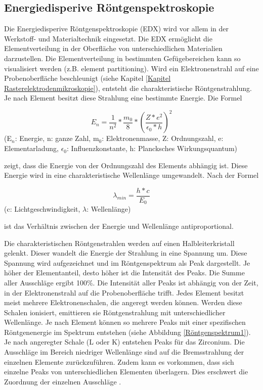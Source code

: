 \documentclass[a4paper, 11pt]{tubsreprt}
\begin{document}
\subsection{Energiedisperive Röntgenspektroskopie}\label{Kapitel EDX}

Die Energiedisperive Röntgenspektroskopie (EDX) wird vor allem in der Werkstoff- und Materialtechnik eingesetzt. Die EDX ermöglicht die Elementverteilung in der Oberfläche von unterschiedlichen Materialien  darzustellen. Die Elementverteilung in bestimmten Gefügebereichen kann so visualisiert werden (z.B. element partitioning).
Wird ein Elektronenstrahl auf eine Probenoberfläche beschleunigt (siehe Kapitel \ref{Kapitel Rasterelektrodenmikroskopie}), entsteht die charakteristische Röntgenstrahlung. Je nach Element besitzt diese Strahlung eine bestimmte Energie. Die Formel

\begin{equation}
E_{ n }=\frac{ 1 }{ n^{ 2 } }*\frac{ m_{ 0 } }{ 8 }*\left( \frac{ Z*e^{ 2 } }{ \epsilon_{ 0 }*h } \right)^{ 2 }
\end{equation}
(E$_{n}$: Energie, n: ganze Zahl, m$_{0}$: Elektronenmasse, Z: Ordnungszahl, e: Elementarladung, $\epsilon_{0}$: Influenzkonstante, h: Plancksches Wirkungsquantum)\cite{Gemming2013}

zeigt, dass die Energie von der Ordnungszahl des Elements abhängig ist. Diese Energie wird in eine charakteristische Wellenlänge umgewandelt. Nach der Formel  

\begin{equation}
\lambda_{ min }=\frac{ h*c }{ E_{ 0 } }
\end{equation}
(c: Lichtgeschwindigkeit, $\lambda$: Wellenlänge)\cite{Gemming2013}

ist das Verhältnis zwischen der Energie und Wellenlänge antiproportional.


Die charakteristischen Röntgenstrahlen werden auf einen Halbleiterkristall gelenkt. Dieser wandelt die Energie der Strahlung in eine Spannung um. Diese Spannung wird aufgezeichnet und im Röntgenspektrum als Peak dargestellt. Je höher der Elementanteil, desto höher ist die Intensität des Peaks. Die Summe aller Ausschläge ergibt 100\%. Die Intensität aller Peaks ist abhängig von der Zeit, in der Elektronenstrahl auf die Probenoberfläche trifft. 
Jedes Element besitzt meist mehrere Elektronenschalen, die angeregt werden können. Werden diese Schalen ionisiert, emittieren sie Röntgenstrahlung mit unterschiedlicher Wellenlänge. Je nach Element können so mehrere Peaks mit einer spezifischen Röntgenenergie im Spektrum entstehen (siehe Abbildung \ref{Röntgenspektrum1}). Je nach angeregter Schale (L oder K) entstehen Peaks für das Zirconium. Die Ausschläge im Bereich niedriger Wellenlänge sind auf die Bremsstrahlung der einzelnen Elemente zurückzuführen. Zudem kann es vorkommen, dass sich einzelne Peaks von unterschiedlichen Elementen überlagern. Dies erschwert die Zuordnung der einzelnen Ausschläge \cite{Gemming2013}. 
\end{document}
